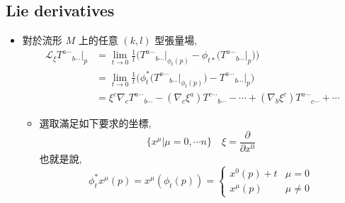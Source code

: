 \subsection{Lie derivatives}
\begin{itemize}
	\item 對於流形 $M$ 上的任意 $(k , l)$ 型張量場,
	\begin{align}
		\mathcal{L}_\xi {T^{a \cdots}}_{b \cdots} \Big|_p &= \lim_{t \rightarrow 0} \frac{1}{t} \Big( {T^{a \cdots}}_{b \cdots} \Big|_{\phi_t(p)} - \phi_{t *} \big( {T^{a \cdots}}_{b \cdots} \Big|_p \big) \Big) \\
		&= \lim_{t \rightarrow 0} \frac{1}{t} \Big( \phi^*_t \big( {T^{a \cdots}}_{b \cdots} \Big|_{\phi_t(p)} \big) - {T^{a \cdots}}_{b \cdots} \Big|_p \Big) \\
		&= \xi^c \nabla_c {T^{a \cdots}}_{b \cdots} - (\nabla_c \xi^a) {T^{c \cdots}}_{b \cdots} - \cdots + (\nabla_b \xi^c) {T^{a \cdots}}_{c \cdots} + \cdots
	\end{align}
	
	\begin{tcolorbox}[title=proof:]
		\begin{itemize}
			\item 選取滿足如下要求的坐標,
			\begin{equation}
				\{ x^\mu | \mu = 0,\cdots n \} \quad \xi = \frac{\partial}{\partial x^0}
			\end{equation}
			也就是說,
			\begin{equation}
				\phi^*_t x^\mu(p) = x^\mu(\phi_t(p)) = \begin{cases}
					x^0(p) + t & \mu = 0 \\
					x^\mu(p) & \mu \neq 0
				\end{cases}
			\end{equation}
			

\end{itemize}
\end{tcolorbox}
\end{itemize}
